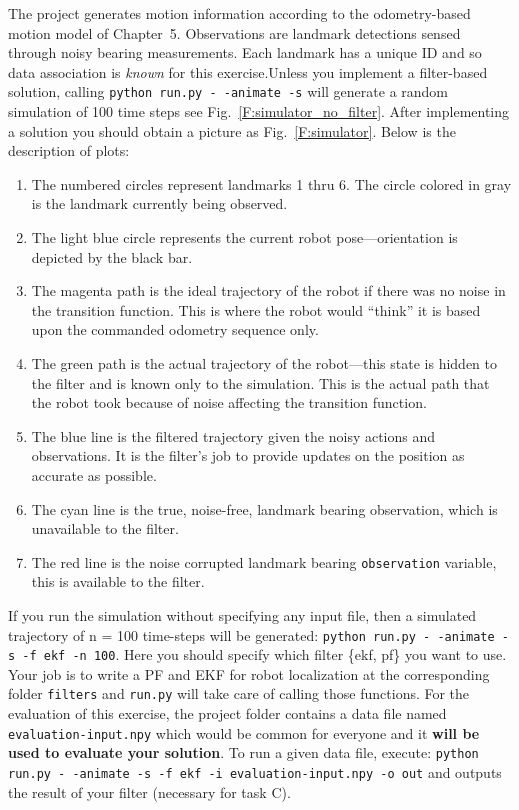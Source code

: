 \documentclass[11pt, oneside, letterpaper]{article}
\providecommand{\figref}[1]{Fig.~\ref{#1}}
\begin{document}
The project generates motion information according to the odometry-based motion model of Chapter~5. Observations are landmark detections sensed through noisy bearing measurements. Each landmark has a unique ID and so data association is \textit{known} for this exercise.Unless you implement a filter-based solution, calling \texttt{python run.py -\,-animate -s} will generate a random simulation of 100 time steps see \figref{F:simulator_no_filter}. After implementing a solution you should obtain a picture as \figref{F:simulator}. Below is the description of plots:
\begin{enumerate}
\item The numbered circles represent landmarks 1 thru 6.  The circle colored in gray is the   landmark currently being observed.
\item The light blue circle represents the current robot pose---orientation is depicted by the black bar.
\item The magenta path is the ideal trajectory of the robot if there was no noise in the transition function. This is where the robot would ``think'' it is based upon the commanded odometry sequence only.
\item The green path is the actual trajectory of the robot---this state is   hidden to the filter and is known only to the simulation.  This is the   actual path that the robot took because of noise affecting the transition function.
\item The blue line is the filtered trajectory given the noisy actions and observations. It is the filter's job to provide updates on the position as accurate as possible.
\item The cyan line is the true, noise-free, landmark bearing observation,   which is unavailable to the filter.
\item The red line is the noise corrupted landmark bearing \texttt{observation} variable, this is available to the filter.
\end{enumerate}

If you run the simulation without specifying any input file, then a simulated trajectory of n = 100 time-steps will be generated: \texttt{python run.py -\,-animate -s -f ekf -n 100}. Here you should specify which filter \{ekf, pf\} you want to use.
Your job is to write a PF and EKF for robot localization at the corresponding folder \texttt{filters} and \texttt{run.py} will take care of calling those functions. 
For the evaluation of this exercise, the project folder contains a data file named \texttt{evaluation-input.npy} which would be common for everyone and it {\bf will be used to evaluate your solution}. To run a given data file, execute: \texttt{python run.py -\,-animate -s -f ekf -i evaluation-input.npy -o out} and outputs the result of your filter (necessary for task C).
\end{document}
